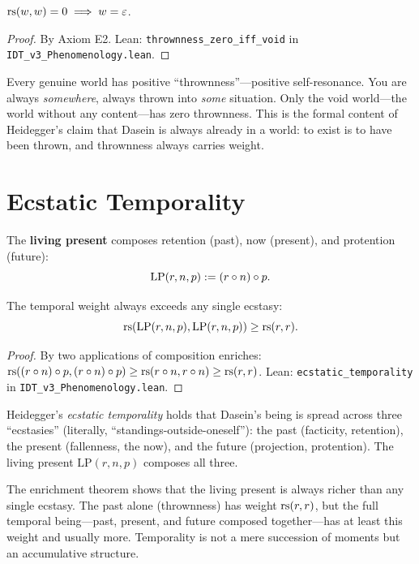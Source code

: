 \begin{theorem}
\label{thm:thrownness-void}
$\mathrm{rs}(w, w) = 0 \implies w = \varepsilon$.
\end{theorem}

\begin{proof}
By Axiom E2.
Lean: \texttt{thrownness\_zero\_iff\_void} in \texttt{IDT\_v3\_Phenomenology.lean}.
\end{proof}

\begin{interpretation}
Every genuine world has positive ``thrownness''---positive self-resonance.
You are always \emph{somewhere}, always thrown into \emph{some} situation.
Only the void world---the world without any content---has zero thrownness.
This is the formal content of Heidegger's claim that Dasein is always already
in a world: to exist is to have been thrown, and thrownness always carries weight.
\end{interpretation}

\section{Ecstatic Temporality}

\begin{definition}
\label{def:living-present}
The \textbf{living present} composes retention (past), now (present),
and protention (future):
\[
\mathrm{LP}(r, n, p) := (r \circ n) \circ p.
\]
\end{definition}

\begin{theorem}
\label{thm:ecstatic-temporal}
The temporal weight always exceeds any single ecstasy:
\[
\mathrm{rs}(\mathrm{LP}(r, n, p), \mathrm{LP}(r, n, p)) \geq \mathrm{rs}(r, r).
\]
\end{theorem}

\begin{proof}
By two applications of composition enriches:
$\mathrm{rs}((r \circ n) \circ p, (r \circ n) \circ p) \geq
\mathrm{rs}(r \circ n, r \circ n) \geq \mathrm{rs}(r, r)$.
Lean: \texttt{ecstatic\_temporality} in \texttt{IDT\_v3\_Phenomenology.lean}.
\end{proof}

\begin{interpretation}
Heidegger's \emph{ecstatic temporality} holds that Dasein's being is spread
across three ``ecstasies'' (literally, ``standings-outside-oneself''): the past
(facticity, retention), the present (fallenness, the now), and the future
(projection, protention). The living present $\mathrm{LP}(r, n, p)$ composes
all three.

The enrichment theorem shows that the living present is always richer than any
single ecstasy. The past alone (thrownness) has weight $\mathrm{rs}(r,r)$, but the
full temporal being---past, present, and future composed together---has at
least this weight and usually more. Temporality is not a mere succession of
moments but an accumulative structure.
\end{interpretation}

